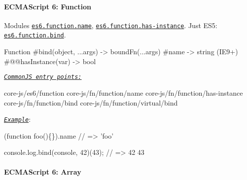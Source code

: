  \paragraph*{E\+C\+M\+A\+Script 6\+: Function}

Modules \href{https://github.com/zloirock/core-js/blob/v2.6.0/modules/es6.function.name.js}{\tt {\ttfamily es6.\+function.\+name}}, \href{https://github.com/zloirock/core-js/blob/v2.6.0/modules/es6.function.has-instance.js}{\tt {\ttfamily es6.\+function.\+has-\/instance}}. Just E\+S5\+: \href{https://github.com/zloirock/core-js/blob/v2.6.0/modules/es6.function.bind.js}{\tt {\ttfamily es6.\+function.\+bind}}. 
\begin{DoxyCode}
Function
  #bind(object, ...args) -> boundFn(...args)
  #name                  -> string (IE9+)
  #@@hasInstance(var)    -> bool
\end{DoxyCode}
 \href{#commonjs}{\tt {\itshape Common\+JS entry points\+:}} 
\begin{DoxyCode}
core-js/es6/function
core-js/fn/function/name
core-js/fn/function/has-instance
core-js/fn/function/bind
core-js/fn/function/virtual/bind
\end{DoxyCode}
 \href{http://goo.gl/zqu3Wp}{\tt {\itshape Example}}\+: 
\begin{DoxyCode}
(function foo()\{\}).name // => 'foo'

console.log.bind(console, 42)(43); // => 42 43
\end{DoxyCode}
 \paragraph*{E\+C\+M\+A\+Script 6\+: Array}


